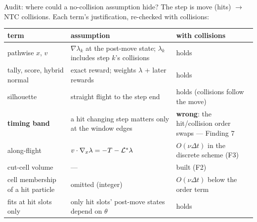 \documentclass[10pt,aspectratio=169]{beamer}
\begin{document}
\begin{frame}{Audit: where could a no-collision assumption hide?}
\footnotesize
The step is move (hits) $\to$ NTC collisions.  Each term's justification, re-checked with collisions:

\medskip
\begin{tabular}{@{}p{3.2cm}p{5.6cm}p{4.2cm}@{}}
\toprule
term & assumption & with collisions\\
\midrule
pathwise $x$, $v$ & $\nabla\lambda_k$ at the post-move state; $\lambda_k$ includes step $k$'s collisions & holds\\
tally, score, hybrid normal & exact reward; weights $\lambda$ + later rewards & holds\\
silhouette & straight flight to the step end & holds (collisions follow the move)\\
\textbf{timing band} & a hit changing step matters only at the window edges & \textbf{wrong}: the hit/collision order swaps --- Finding 7\\
along-flight & $v\cdot\nabla_x\lambda = -T-\mathcal L^*\lambda$ & $O(\nu\Delta t)$ in the discrete scheme (F3)\\
cut-cell volume & --- & built (F2)\\
cell membership of a hit particle & omitted (integer) & $O(\nu\Delta t)$ below the order term\\
fits at hit slots only & only hit slots' post-move states depend on $\theta$ & holds\\
\bottomrule
\end{tabular}
\end{frame}
\end{document}
